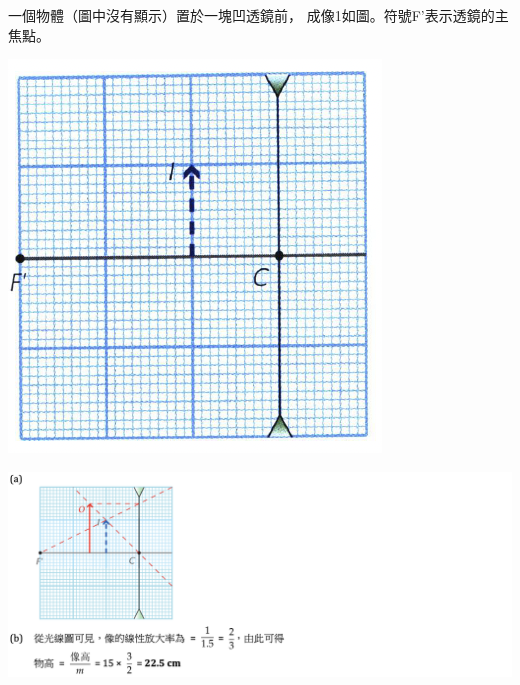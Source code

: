 {
    一個物體（圖中沒有顯示）置於一塊凹透鏡前， 成像1如圖。符號F'表示透鏡的主焦點。
    \par{\par\centering\includegraphics[width=.45\textwidth]{./img/ch3_lens_lq_2024-05-18-17-56-56.png}\par}
}{
    \sol\par{\par\centering\includegraphics[width=\textwidth]{./img/ch3_lens_lq_2024-05-18-18-00-28.png}\par}
}

